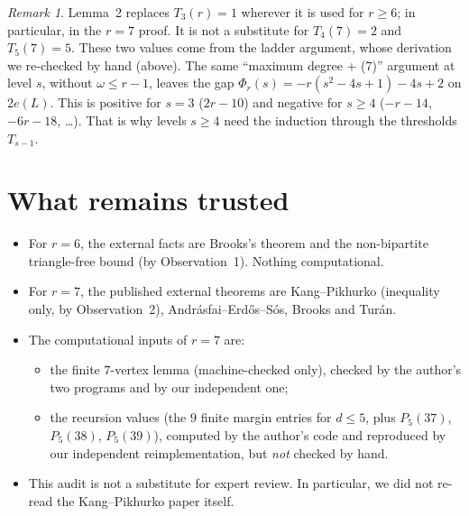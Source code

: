 \documentclass[11pt]{amsart}
\theoremstyle{remark}\newtheorem*{remark}{Remark}
\begin{document}
\begin{remark}
Lemma~2 replaces $T_3(r)=1$ wherever it is used for $r\ge6$; in particular, in the $r=7$ proof. It is not a substitute for
$T_4(7)=2$ and $T_5(7)=5$. These two values come from the ladder argument, whose derivation we re-checked by hand (above).
The same ``maximum degree + (7)'' argument at level $s$, without $\omega\le r-1$, leaves the gap
$\Phi_r(s)=-r(s^2-4s+1)-4s+2$ on $2e(L)$. This is positive for $s=3$ ($2r-10$) and negative for $s\ge4$
($-r-14$, $-6r-18$, \dots). That is why levels $s\ge4$ need the induction through the thresholds $T_{s-1}$.
\end{remark}

\section{What remains trusted}
\begin{itemize}
\item For $r=6$, the external facts are Brooks's theorem and the non-bipartite triangle-free bound (by Observation~1). Nothing computational.
\item For $r=7$, the published external theorems are Kang--Pikhurko (inequality only, by Observation~2), Andr\'asfai--Erd\H{o}s--S\'os, Brooks
  and Tur\'an.
\item The computational inputs of $r=7$ are:
  \begin{itemize}
  \item the finite $7$-vertex lemma (machine-checked only), checked by the author's two programs and by our independent one;
  \item the recursion values (the $9$ finite margin entries for $d\le5$, plus $P_5(37)$, $P_5(38)$, $P_5(39)$), computed by the author's
    code and reproduced by our independent reimplementation, but \emph{not} checked by hand.
  \end{itemize}
\item This audit is not a substitute for expert review. In particular, we did not re-read the Kang--Pikhurko paper itself.
\end{itemize}
\end{document}
